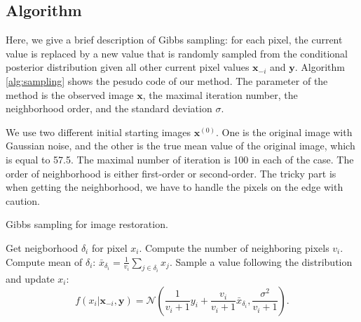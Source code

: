 \subsection{Algorithm}
Here, we give a brief description of Gibbs sampling:
for each pixel, the current value is replaced by a new value that is randomly sampled from the conditional posterior distribution given all other current pixel values $\mathbf{x}_{-i}$ and $\mathbf{y}$. Algorithm \ref{alg:sampling} shows the pesudo code of our method. The parameter of the method is the observed image $\mathbf{x}$, the maximal iteration number, the neighborhood order, and the standard deviation $\sigma$.

We use two different initial starting images $\mathbf{x}^{(0)}$. One is the original image with Gaussian noise, and the other is the true mean value of the original image, which is equal to 57.5. The maximal number of iteration is 100 in each of the case. The order of neighborhood is either first-order or second-order. The tricky part is when getting the neighborhood, we have to handle the pixels on the edge with caution. 

\begin{algorithm}
\caption{Gibbs sampling for image restoration.}\label{alg:sampling}
\begin{algorithmic}[1]
		\State Get neigborhood $\delta_i$ for pixel $x_i$.
		\State Compute the number of neighboring pixels $v_i$.
		\State Compute mean of $\delta_i$: $\bar{x}_{\delta_i} = \frac{1}{v_i}\sum_{j\in\delta_i}{x_j}$.
    	\State Sample a value following the distribution and update $x_i$: $$f(x_i|\mathbf{x}_{-i}, \mathbf{y}) = \mathcal{N}\left(\frac{1}{v_i+1}y_i+\frac{v_i}{v_i+1}\bar{x}_{\delta_i},\frac{\sigma^2}{v_i+1}\right).$$
	\EndFor
\EndFor
\EndFunction
\end{algorithmic}
\end{algorithm}

